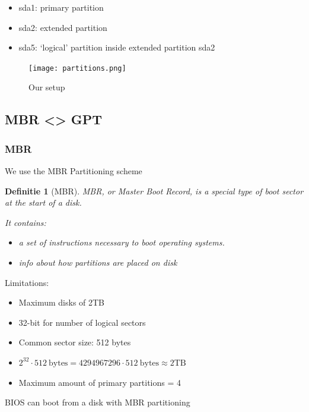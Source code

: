 \documentclass{article}
\newtheorem{theorem}{Definitie}[section]
\begin{document}
\begin{itemize}
    \item sda1: primary partition
    \item sda2: extended partition
    \item sda5: `logical' partition inside extended partition sda2
\end{itemize}

\begin{figure}[H]
    \centering
    \texttt{[image: partitions.png]}
    \caption{Our setup}
\end{figure}

\subsection{MBR <> GPT}

\subsubsection{MBR}

We use the MBR Partitioning scheme

\begin{theorem}[MBR]
MBR, or Master Boot Record, is a special type of boot sector at the start of a disk.

It contains: 

\begin{itemize}
    \item a set of instructions necessary to boot operating systems.
    \item info about how partitions are placed on disk
\end{itemize}


\end{theorem}

Limitations:

\begin{itemize}
    \item Maximum disks of 2TB
    \item 32-bit for number of logical sectors
    \item Common sector size: 512 bytes
    \item $2^{32} \cdot 512\ \text{bytes} = 4294967296 \cdot 512\ \text{bytes} \approx 2\text{TB}$
    \item Maximum amount of primary partitions = 4
\end{itemize}

BIOS can boot from a disk with MBR partitioning
\end{document}
